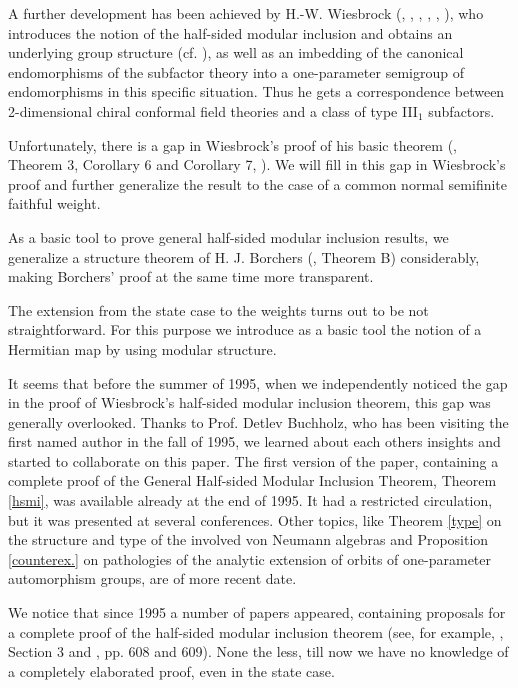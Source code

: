\documentclass[reqno]{amsart}
\theoremstyle{definition}
\theoremstyle{remark}
\numberwithin{equation}{section}
\theoremstyle{plain}
\begin{document}
A further development has been achieved by H.-W. Wiesbrock (\cite{Wie1},
\cite{Wie2}, \cite{Wie3}, \cite{Wie4}, \cite{Wie5}, \cite{Wie6}), who
introduces the notion of the half-sided modular inclusion and obtains
an underlying group structure (cf. \cite{Sch}), as well as an
imbedding of the canonical endomorphisms of the subfactor theory into
a one-parameter semigroup of endomorphisms in this specific situation.
Thus he gets a correspondence between 2-dimensional chiral conformal
field theories and a class of type III$_1$ subfactors.

Unfortunately, there is a gap in Wiesbrock's proof of his basic
theorem (\cite{Wie1}, Theorem 3, Corollary 6 and Corollary 7,
\cite{Wie6}). We will fill in this gap in Wiesbrock's proof and
further generalize the result to the case of a common normal
semifinite faithful weight.

As a basic tool to prove general half-sided modular inclusion results,
we generalize a structure theorem of H. J. Borchers (\cite{Bo3},
Theorem B) considerably, making Borchers' proof at the same time more
transparent.

The extension from the state case to the weights turns out to be not
straightforward. For this purpose we introduce as a basic tool the
notion of a Hermitian map by using modular structure.

It seems that before the summer of 1995, when we independently
noticed the gap in the proof of Wiesbrock's half-sided modular
inclusion theorem, this gap was generally overlooked. Thanks to
Prof. Detlev Buchholz, who has been visiting the first named author
in the fall of 1995, we learned about each others insights and
started to collaborate on this paper. The first version of the
paper, containing a complete proof of the General Half-sided
Modular Inclusion Theorem, Theorem \ref{hsmi}, was available
already at the end of 1995. It had a restricted circulation,
but it was presented at several conferences. Other topics, like
Theorem \ref{type} on the structure and type of the involved
von Neumann algebras and Proposition \ref{counterex.} on
pathologies of the analytic extension of orbits of one-parameter
automorphism groups, are of more recent date.

We notice that since 1995 a number of papers appeared, containing
proposals for a complete proof of the half-sided modular inclusion
theorem (see, for example, \cite{Fl}, Section 3 and \cite{Bo-Y},
pp. 608 and 609). None the less, till now we have no knowledge of
a completely elaborated proof, even in the state case.
\end{document}
